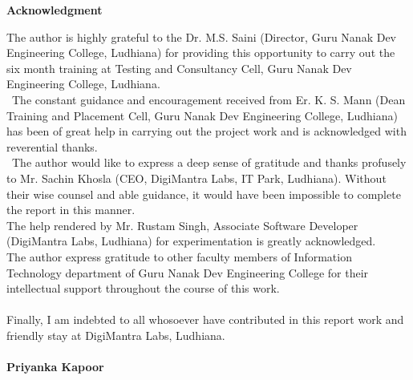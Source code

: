 
\begin{center}
\textbf{Acknowledgment}                           %
\end{center}
The author is highly grateful to the Dr. M.S. Saini (Director, Guru Nanak Dev Engineering College, Ludhiana) for providing this opportunity to carry out the six month training at Testing and Consultancy Cell, Guru Nanak Dev Engineering College, Ludhiana.\\
 The constant guidance and encouragement received from Er. K. S. Mann (Dean Training and Placement Cell, Guru Nanak Dev Engineering
College, Ludhiana) has been of great help in carrying out the project work and is acknowledged with reverential thanks.\\
 The author would like to express a deep sense of gratitude and thanks profusely to Mr. Sachin Khosla (CEO, DigiMantra Labs,
IT Park, Ludhiana). Without their wise counsel and able guidance, it would have been impossible to complete the report in this manner. \\
The help rendered by Mr. Rustam Singh, Associate Software Developer (DigiMantra Labs, Ludhiana) for experimentation is greatly acknowledged.\\
The author express gratitude to other faculty members of Information Technology department of Guru Nanak Dev Engineering College for their intellectual support throughout the course of this work.\\ \\
Finally, I am indebted to all whosoever have contributed in this report work and friendly stay at DigiMantra Labs, Ludhiana.\\ \\
\textbf{Priyanka Kapoor}

